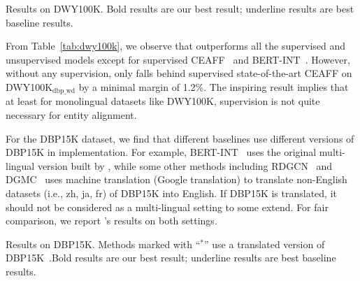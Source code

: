 \begin{table}[t]
	\centering
	\renewcommand\tabcolsep{9pt}
	\renewcommand\arraystretch{0.95}
	\caption{Results on DWY100K. \textmd{Bold results are our best result; underline results are best baseline results.}}
	
	\label{tab:dwy100k}
\end{table}

From Table~\ref{tab:dwy100k}, we observe that \solution outperforms all the supervised and unsupervised models except for supervised CEAFF~\cite{CEAFF} and BERT-INT~\cite{tang2019bert-int}. However, without any supervision, \solution only falls behind supervised state-of-the-art CEAFF on DWY100K$_{\text{dbp\_wd}}$ by a minimal margin of 1.2\%.  The inspiring result implies that at least for monolingual datasets like DWY100K, supervision is not quite necessary for entity alignment.



For the DBP15K dataset, we find that different baselines use different versions of DBP15K in implementation. For example, BERT-INT~\cite{tang2019bert-int} uses the original multi-lingual version built by \cite{JAPE}, while some other methods including RDGCN~\cite{wu2019relation} and DGMC~\cite{fey2020deep} uses machine translation (Google translation) to translate non-English datasets (i.e., zh, ja, fr) of DBP15K into English. If DBP15K is translated, it should not be considered as a multi-lingual setting to some extend. For fair comparison, we report \solution's results on both settings.


\begin{table}[t]
	\centering
    \renewcommand\tabcolsep{3.5pt}
	\caption{Results on DBP15K. \textmd{Methods marked with ``$^*$'' use a translated version of DBP15K~\cite{xu2019cross-lingual}.Bold results are our best result; underline results are best baseline results.}}
	\renewcommand\arraystretch{0.9}
	
	\vspace{-5mm}
\end{table}

